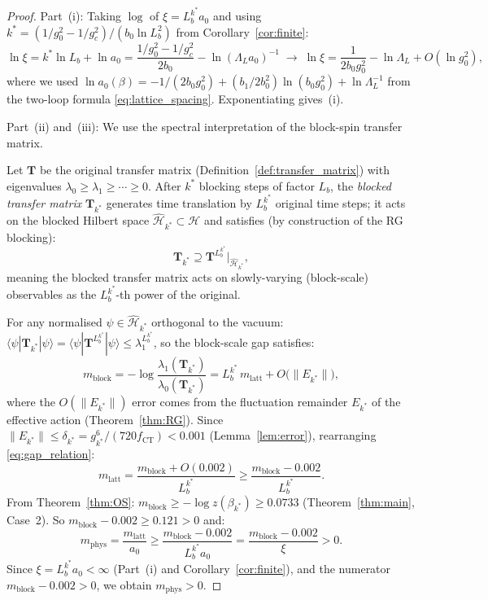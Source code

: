 \documentclass[11pt,a4paper]{amsart}
\theoremstyle{definition}
\newcommand{\gB}{g^2_c}
\newcommand{\CT}{\mathrm{CT}}
\begin{document}
\begin{proof}
Part~(i): Taking $\log$ of $\xi = L_b^{k^*} a_0$ and using
$k^* = (1/g^2_0 - 1/\gB)/(b_0 \ln L_b^2)$ from Corollary~\ref{cor:finite}:
\[
   \ln\xi = k^* \ln L_b + \ln a_0
   = \frac{1/g^2_0 - 1/\gB}{2b_0}
     - \ln(\Lambda_L a_0)^{-1}
   \;\longrightarrow\;
   \ln\xi = \frac{1}{2b_0 g^2_0} - \ln\Lambda_L
     + O(\ln g^2_0),
\]
where we used $\ln a_0(\beta) = -1/(2b_0 g^2_0) + (b_1/2b_0^2)\ln(b_0 g^2_0) + \ln\Lambda_L^{-1}$
from the two-loop formula \eqref{eq:lattice_spacing}.  Exponentiating gives~(i).

Part~(ii) and~(iii): We use the spectral interpretation of the block-spin
transfer matrix.

Let $\mathbf{T}$ be the original transfer matrix (Definition~\ref{def:transfer_matrix})
with eigenvalues $\lambda_0 \ge \lambda_1 \ge \cdots \ge 0$.
After $k^*$ blocking steps of factor $L_b$, the \emph{blocked transfer matrix}
$\mathbf{T}_{k^*}$ generates time translation by $L_b^{k^*}$ original time steps;
it acts on the blocked Hilbert space $\hat{\mathcal{H}}_{k^*} \subset \mathcal{H}$
and satisfies (by construction of the RG blocking):
\begin{equation}
\label{eq:Tblock}
  \mathbf{T}_{k^*} \supseteq \mathbf{T}^{L_b^{k^*}}\bigr|_{\hat{\mathcal{H}}_{k^*}},
\end{equation}
meaning the blocked transfer matrix acts on slowly-varying (block-scale) observables
as the $L_b^{k^*}$-th power of the original.

For any normalised $\psi \in \hat{\mathcal{H}}_{k^*}$ orthogonal to the vacuum:
$\langle\psi|\mathbf{T}_{k^*}|\psi\rangle = \langle\psi|\mathbf{T}^{L_b^{k^*}}|\psi\rangle
 \le \lambda_1^{L_b^{k^*}}$,
so the block-scale gap satisfies:
\begin{equation}
\label{eq:gap_relation}
  m_{\mathrm{block}}
  = -\log\frac{\lambda_1(\mathbf{T}_{k^*})}{\lambda_0(\mathbf{T}_{k^*})}
  = L_b^{k^*}\,m_{\mathrm{latt}} + O\!\bigl(\|E_{k^*}\|\bigr),
\end{equation}
where the $O(\|E_{k^*}\|)$ error comes from the fluctuation remainder
$E_{k^*}$ of the effective action (Theorem~\ref{thm:RG}).
Since $\|E_{k^*}\| \le \delta_{k^*} = g^6_{k^*}/(720 f_{\CT}) < 0.001$
(Lemma~\ref{lem:error}), rearranging \eqref{eq:gap_relation}:
\begin{equation}
\label{eq:mlatt_from_block}
  m_{\mathrm{latt}}
  = \frac{m_{\mathrm{block}} + O(0.002)}{L_b^{k^*}}
  \ge \frac{m_{\mathrm{block}} - 0.002}{L_b^{k^*}}.
\end{equation}
From Theorem~\ref{thm:OS}: $m_{\mathrm{block}} \ge -\log z(\beta_{k^*}) \ge 0.0733$
(Theorem~\ref{thm:main}, Case~2).
So $m_{\mathrm{block}} - 0.002 \ge 0.121 > 0$ and:
\begin{equation}
\label{eq:mphys_final}
  m_{\mathrm{phys}}
  = \frac{m_{\mathrm{latt}}}{a_0}
  \ge \frac{m_{\mathrm{block}} - 0.002}{L_b^{k^*} a_0}
  = \frac{m_{\mathrm{block}} - 0.002}{\xi}
  > 0.
\end{equation}
Since $\xi = L_b^{k^*} a_0 < \infty$ (Part~(i) and Corollary~\ref{cor:finite}),
and the numerator $m_{\mathrm{block}} - 0.002 > 0$, we obtain $m_{\mathrm{phys}} > 0$.


\end{proof}
\end{document}
